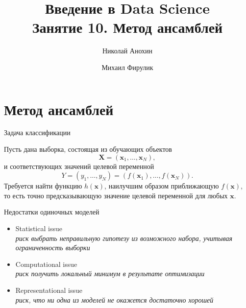 \documentclass[10pt,a4paper]{beamer}
\author{Николай Анохин \and Михаил Фирулик}
\title{Введение в Data Science \\ Занятие 10. Метод ансамблей}
\begin{document}
\maketitle


\begin{frame}

\tableofcontents

\end{frame}


\section{Метод ансамблей}


\begin{frame}{Задача классификации}

Пусть дана выборка, состоящая из обучающих объектов 
\[
\mathbf{X} = (\mathbf{x}_1, \ldots, \mathbf{x}_N),
\]  
и соответствующих значений целевой переменной 
\[
Y = (y_1, \ldots, y_N) = (f(\mathbf{x}_1), \ldots, f(\mathbf{x}_N)).
\]
Требуется найти функцию $h(\mathbf{x})$, наилучшим образом приближающую $f(\mathbf{x})$, то есть точно предсказывающую значение целевой переменной для любых $\mathbf{x}$.

\end{frame}


\begin{frame}{Недостатки одиночных моделей}

\begin{itemize}
\item Statistical issue \\
{\it риск выбрать неправильную гипотезу из возможного набора, учитывая ограниченность выборки}
\item Computational issue \\
{\it риск получить локальный минимум в результате оптимизации}
\item Representational issue \\
{\it риск, что ни одна из моделей не окажется достаточно хорошей}
\end{itemize}

\end{frame}
\end{document}
